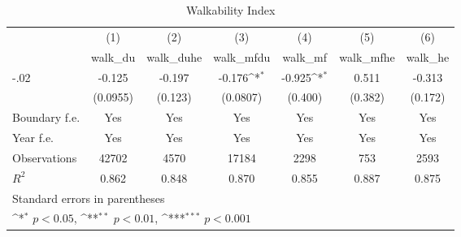 \begin{table}[htbp]\centering
\def\sym#1{\ifmmode^{#1}\else\(^{#1}\)\fi}
\caption{Walkability Index}
\begin{tabular}{l*{6}{c}}
\hline\hline
                    &\multicolumn{1}{c}{(1)}&\multicolumn{1}{c}{(2)}&\multicolumn{1}{c}{(3)}&\multicolumn{1}{c}{(4)}&\multicolumn{1}{c}{(5)}&\multicolumn{1}{c}{(6)}\\
                    &\multicolumn{1}{c}{walk\_du}&\multicolumn{1}{c}{walk\_duhe}&\multicolumn{1}{c}{walk\_mfdu}&\multicolumn{1}{c}{walk\_mf}&\multicolumn{1}{c}{walk\_mfhe}&\multicolumn{1}{c}{walk\_he}\\
\hline
-.02                &      -0.125         &      -0.197         &      -0.176\sym{*}  &      -0.925\sym{*}  &       0.511         &      -0.313         \\
                    &    (0.0955)         &     (0.123)         &    (0.0807)         &     (0.400)         &     (0.382)         &     (0.172)         \\
[1em]
Boundary f.e.       &         Yes         &         Yes         &         Yes         &         Yes         &         Yes         &         Yes         \\
[1em]
Year f.e.           &         Yes         &         Yes         &         Yes         &         Yes         &         Yes         &         Yes         \\
\hline
Observations        &       42702         &        4570         &       17184         &        2298         &         753         &        2593         \\
\(R^{2}\)           &       0.862         &       0.848         &       0.870         &       0.855         &       0.887         &       0.875         \\
\hline\hline
\multicolumn{7}{l}{\footnotesize Standard errors in parentheses}\\
\multicolumn{7}{l}{\footnotesize \sym{*} \(p<0.05\), \sym{**} \(p<0.01\), \sym{***} \(p<0.001\)}\\
\end{tabular}
\end{table}
